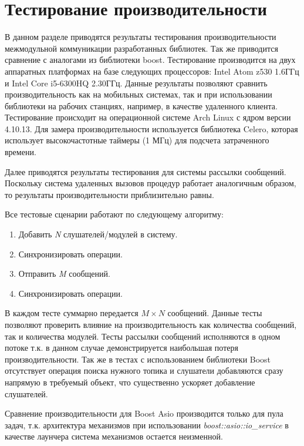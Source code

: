 \section{Тестирование производительности}

В данном разделе приводятся результаты тестирования 
производительности межмодульной коммуникации разработанных 
библиотек. Так же приводится сравнение с аналогами из библиотеки 
boost. Тестирование производится на двух аппаратных платформах 
на базе следующих процессоров: Intel Atom z530 1.6ГГц и Intel 
Core i5-6300HQ 2.30ГГц. Данные результаты позволяют сравнить 
производительность как на мобильных системах, так и при 
использовании библиотеки на рабочих станциях, например, в 
качестве удаленного клиента. Тестирование происходит на 
операционной системе Arch Linux с ядром версии 4.10.13. Для 
замера производительности используется библиотека Celero, 
которая использует высокочастотные таймеры (1 МГц) для подсчета 
затраченного времени.

Далее приводятся результаты тестирования для системы рассылки сообщений. Поскольку система удаленных вызовов процедур работает аналогичным образом, то результаты производительности приблизительно равны.

Все тестовые сценарии работают по следующему алгоритму:

\begin{enumerate}
    \item Добавить \textit{N} слушателей/модулей в систему.
    \item Синхронизировать операции.
    \item Отправить \textit{M} сообщений.
    \item Синхронизировать операции.
\end{enumerate}

В каждом тесте суммарно передается $M \times N$ сообщений. 
Данные тесты позволяют проверить влияние на производительность 
как количества сообщений, так и количества модулей. Тесты 
рассылки сообщений исполняются в одном потоке т.к. в данном 
случае демонстрируется наибольшая потеря производительности. Так 
же в тестах с использованием библиотеки Boost отсутствует 
операция поиска нужного топика и слушатели добавляются сразу 
напрямую в требуемый объект, что существенно ускоряет добавление 
слушателей.

Сравнение производительности для Boost Asio производится только 
для пула задач, т.к. архитектура механизмов при использовании 
\textit{boost::asio::io\_service} в качестве лаунчера система 
механизмов остается неизменной.


